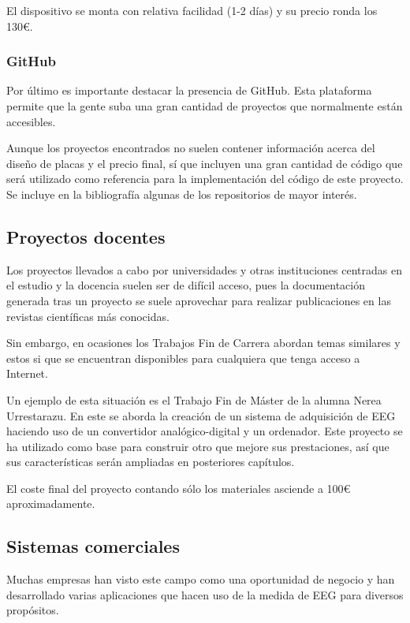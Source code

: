 El dispositivo se monta con relativa facilidad (1-2 días) y su precio ronda los 130€.

\subsubsection{GitHub}

Por último es importante destacar la presencia de GitHub. Esta plataforma permite que la gente suba una gran cantidad de proyectos que normalmente están accesibles.

Aunque los proyectos encontrados no suelen contener información acerca del diseño de placas y el precio final, sí que incluyen una gran cantidad de código que será utilizado como referencia para la implementación del código de este proyecto. Se incluye en la bibliografía algunas de los repositorios de mayor interés.

\subsection{Proyectos docentes\label{sec:Pro_docentes}}

Los proyectos llevados a cabo por universidades y otras instituciones centradas en el estudio y la docencia suelen ser de difícil acceso, pues la documentación generada tras un proyecto se suele aprovechar para realizar publicaciones en las revistas científicas más conocidas.

Sin embargo, en ocasiones los Trabajos Fin de Carrera abordan temas similares y estos si que se encuentran disponibles para cualquiera que tenga acceso a Internet. 

Un ejemplo de esta situación es el Trabajo Fin de Máster de la alumna Nerea Urrestarazu. En este se aborda la creación de un sistema de adquisición de \acrshort{EEG} haciendo uso de un convertidor analógico-digital y un ordenador. Este proyecto se ha utilizado como base para construir otro que mejore sus prestaciones, así que sus características serán ampliadas en posteriores capítulos.

El coste final del proyecto contando sólo los materiales asciende a 100€ aproximadamente.

\subsection{Sistemas comerciales\label{sec:Pro_empresa}}

Muchas empresas han visto este campo como una oportunidad de negocio y han desarrollado varias aplicaciones que hacen uso de la medida de \acrshort{EEG} para diversos propósitos.

